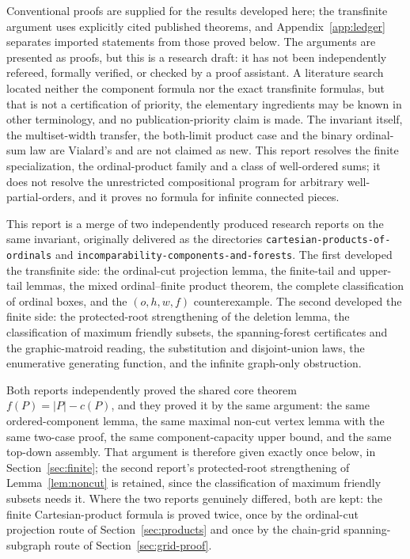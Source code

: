 \documentclass[11pt,letterpaper]{article}
\theoremstyle{definition}
\theoremstyle{remark}
\newcommand{\fot}{f}
\begin{document}
\vspace{.6em}
\begin{resultbox}[title={\bfseries Status and scope}]
\small
Conventional proofs are supplied for the results developed here; the
transfinite argument uses explicitly cited published theorems, and
Appendix~\ref{app:ledger} separates imported statements from those proved
below. The arguments are presented as proofs, but this is a research draft:
it has not been independently refereed, formally verified, or checked by a
proof assistant. A literature search located neither the component formula
nor the exact transfinite formulas, but that is not a certification of
priority, the elementary ingredients may be known in other terminology, and
no publication-priority claim is made. The invariant itself, the
multiset-width transfer, the both-limit product case and the binary
ordinal-sum law are Vialard's and are not claimed as new. This report
resolves the finite specialization, the ordinal-product family and a class of
well-ordered sums; it does not resolve the unrestricted compositional program
for arbitrary well-partial-orders, and it proves no formula for infinite
connected pieces.
\end{resultbox}

\vspace{.6em}
\begin{resultbox}[title={\bfseries Provenance}]
\small
This report is a merge of two independently produced research reports on the
same invariant, originally delivered as the directories
\texttt{cartesian-products-of-ordinals} and
\texttt{incomparability-components-and-forests}. The first developed the
transfinite side: the ordinal-cut projection lemma, the finite-tail and
upper-tail lemmas, the mixed ordinal--finite product theorem, the complete
classification of ordinal boxes, and the $(o,h,w,f)$ counterexample. The
second developed the finite side: the protected-root strengthening of the
deletion lemma, the classification of maximum friendly subsets, the
spanning-forest certificates and the graphic-matroid reading, the
substitution and disjoint-union laws, the enumerative generating function,
and the infinite graph-only obstruction.

Both reports independently proved the shared core theorem
$\fot(P)=|P|-c(P)$, and they proved it by the same argument: the same
ordered-component lemma, the same maximal non-cut vertex lemma with the same
two-case proof, the same component-capacity upper bound, and the same
top-down assembly. That argument is therefore given exactly once below, in
Section~\ref{sec:finite}; the second report's protected-root strengthening
of Lemma~\ref{lem:noncut} is retained, since the classification of maximum
friendly subsets needs it. Where the two reports genuinely differed, both are
kept: the finite Cartesian-product formula is proved twice, once by the
ordinal-cut projection route of Section~\ref{sec:products} and once by the
chain-grid spanning-subgraph route of Section~\ref{sec:grid-proof}.
\end{resultbox}
\clearpage
\end{document}
